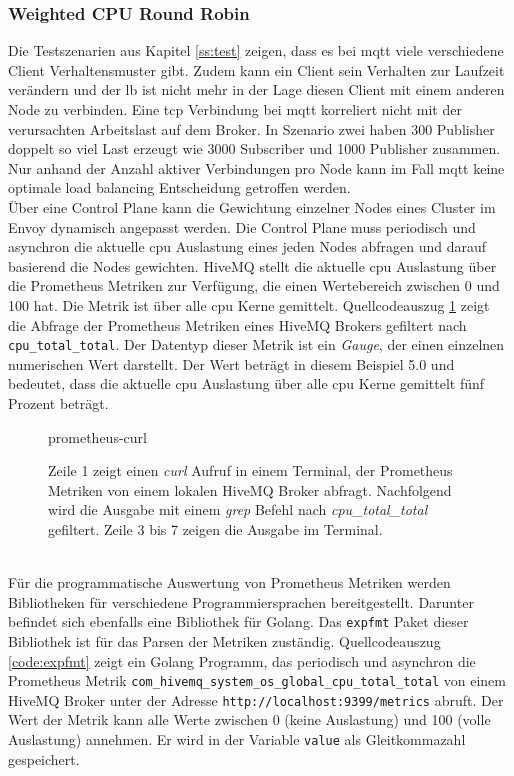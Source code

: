 \subsubsection{Weighted CPU Round Robin} \label{ss:weighted-cpu}
Die Testszenarien aus Kapitel \ref{ss:test} zeigen, dass es bei \ac{mqtt} viele verschiedene Client Verhaltensmuster gibt. Zudem kann ein Client sein Verhalten zur Laufzeit verändern und der \acl{lb} ist nicht mehr in der Lage diesen Client mit einem anderen Node zu verbinden.
Eine \ac{tcp} Verbindung bei \ac{mqtt} korreliert nicht mit der verursachten Arbeitslast auf dem Broker. In Szenario zwei haben 300 Publisher doppelt so viel Last erzeugt wie 3000 Subscriber und 1000 Publisher zusammen.
Nur anhand der Anzahl aktiver Verbindungen pro Node kann im Fall \ac{mqtt} keine optimale load balancing Entscheidung getroffen werden.
\\
Über eine Control Plane kann die Gewichtung einzelner Nodes eines Cluster im Envoy dynamisch angepasst werden.
Die Control Plane muss periodisch und asynchron die aktuelle \ac{cpu} Auslastung eines jeden Nodes abfragen und darauf basierend die Nodes gewichten.
HiveMQ stellt die aktuelle \ac{cpu} Auslastung über die Prometheus Metriken zur Verfügung, die einen Wertebereich zwischen 0 und 100 hat. Die Metrik ist über alle \ac{cpu} Kerne gemittelt.
Quellcodeauszug \ref{code:prometheus-curl} zeigt die Abfrage der Prometheus Metriken eines HiveMQ Brokers gefiltert nach \verb|cpu_total_total|. Der Datentyp dieser Metrik ist ein \textit{Gauge}, der einen einzelnen numerischen Wert darstellt.\cite{prometheusMetricTypesPrometheus} Der Wert beträgt in diesem Beispiel 5.0 und bedeutet, dass die aktuelle \ac{cpu} Auslastung über alle \ac{cpu} Kerne gemittelt fünf Prozent beträgt.
\begin{figure}
    {prometheus-curl}
    \caption{Zeile 1 zeigt einen \textit{curl} Aufruf in einem Terminal, der Prometheus Metriken von einem lokalen HiveMQ Broker abfragt. Nachfolgend wird die Ausgabe mit einem \textit{grep} Befehl nach \textit{cpu\_total\_total} gefiltert. Zeile 3 bis 7 zeigen die Ausgabe im Terminal.}
    \label{code:prometheus-curl}
\end{figure}
\\
Für die programmatische Auswertung von Prometheus Metriken werden Bibliotheken für verschiedene Programmiersprachen bereitgestellt. Darunter befindet sich ebenfalls eine Bibliothek für Golang. Das \verb|expfmt| Paket dieser Bibliothek ist für das Parsen der Metriken zuständig.\cite{ExpfmtPkgGo}
Quellcodeauszug \ref{code:expfmt} zeigt ein Golang Programm, das periodisch und asynchron die Prometheus Metrik \verb|com_hivemq_system_os_global_cpu_total_total| von einem HiveMQ Broker unter der Adresse \verb|http://localhost:9399/metrics| abruft. Der Wert der Metrik kann alle Werte zwischen 0 (keine Auslastung) und 100 (volle Auslastung) annehmen. Er wird in der Variable \verb|value| als Gleitkommazahl gespeichert.
